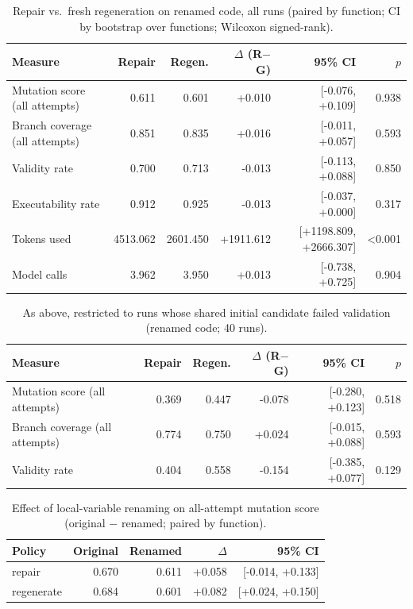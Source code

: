 \begin{table}[t]
\centering\small
\caption{Repair vs.\ fresh regeneration on renamed code, all runs (paired by function; CI by bootstrap over functions; Wilcoxon signed-rank).}
\label{tab:main-renamed}
\begin{tabular}{lrrrrr}
\toprule
Measure & Repair & Regen. & $\Delta$ (R$-$G) & 95\% CI & $p$ \\
\midrule
Mutation score (all attempts) & 0.611 & 0.601 & +0.010 & [-0.076, +0.109] & 0.938 \\
Branch coverage (all attempts) & 0.851 & 0.835 & +0.016 & [-0.011, +0.057] & 0.593 \\
Validity rate & 0.700 & 0.713 & -0.013 & [-0.113, +0.088] & 0.850 \\
Executability rate & 0.912 & 0.925 & -0.013 & [-0.037, +0.000] & 0.317 \\
Tokens used & 4513.062 & 2601.450 & +1911.612 & [+1198.809, +2666.307] & <0.001 \\
Model calls & 3.962 & 3.950 & +0.013 & [-0.738, +0.725] & 0.904 \\
\bottomrule
\end{tabular}
\end{table}

\begin{table}[t]
\centering\small
\caption{As above, restricted to runs whose shared initial candidate failed validation (renamed code; 40 runs).}
\label{tab:fail-renamed}
\begin{tabular}{lrrrrr}
\toprule
Measure & Repair & Regen. & $\Delta$ (R$-$G) & 95\% CI & $p$ \\
\midrule
Mutation score (all attempts) & 0.369 & 0.447 & -0.078 & [-0.280, +0.123] & 0.518 \\
Branch coverage (all attempts) & 0.774 & 0.750 & +0.024 & [-0.015, +0.088] & 0.593 \\
Validity rate & 0.404 & 0.558 & -0.154 & [-0.385, +0.077] & 0.129 \\
\bottomrule
\end{tabular}
\end{table}

\begin{table}[t]
\centering\small
\caption{Effect of local-variable renaming on all-attempt mutation score (original $-$ renamed; paired by function).}
\label{tab:rename}
\begin{tabular}{lrrrr}
\toprule
Policy & Original & Renamed & $\Delta$ & 95\% CI \\
\midrule
repair & 0.670 & 0.611 & +0.058 & [-0.014, +0.133] \\
regenerate & 0.684 & 0.601 & +0.082 & [+0.024, +0.150] \\
\bottomrule
\end{tabular}
\end{table}

